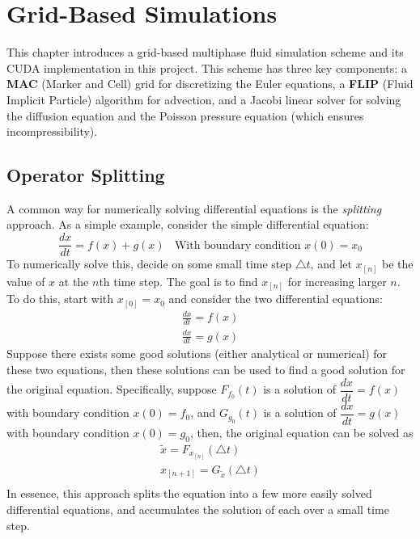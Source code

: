 \chapter{Grid-Based Simulations}
\label{chapter grid}

This chapter introduces a grid-based multiphase fluid simulation scheme and its CUDA implementation in this project. This scheme has three key components: a \textbf{MAC} (Marker and Cell) grid for discretizing the Euler equations, a \textbf{FLIP} (Fluid Implicit Particle) algorithm for advection, and a Jacobi linear solver for solving the diffusion equation and the Poisson pressure equation (which ensures incompressibility).

\section{Operator Splitting}

A common way for numerically solving differential equations is the \textit{splitting} approach. As a simple example, consider the simple differential equation:
$$
\frac{dx}{dt} = f(x)+g(x) ~~~~\mbox{With boundary condition $x(0)=x_0$}
$$
To numerically solve this, decide on some small time step $\triangle t$, and let $x_{[n]}$ be the value of $x$ at the $n$th time step. The goal is to find $x_{[n]}$ for increasing larger $n$. To do this, start with $x_{[0]}=x_0$ and consider the two differential equations:
\begin{equation*}
    \begin{aligned}
        \frac{dx}{dt} = f(x)\\
        \frac{dx}{dt} = g(x)
    \end{aligned}
\end{equation*}
Suppose there exists some good solutions (either analytical or numerical) for these two equations, then these solutions can be used to find a good solution for the original equation. Specifically, suppose $F_{f_0}(t)$ is a solution of $\dfrac{dx}{dt} = f(x)$ with boundary condition $x(0)=f_0$, and $G_{g_0}(t)$ is a solution of $\dfrac{dx}{dt} = g(x)$ with boundary condition $x(0)=g_0$, then, the original equation can be solved as 
\begin{equation*}
    \begin{aligned}
        \widetilde{x} = F_{x_{[n]}}(\triangle t) \\
        x_{[n+1]} = G_{\widetilde{x}}(\triangle t) \\
    \end{aligned}
\end{equation*}
In essence, this approach splits the equation into a few more easily solved differential equations, and accumulates the solution of each over a small time step. 

